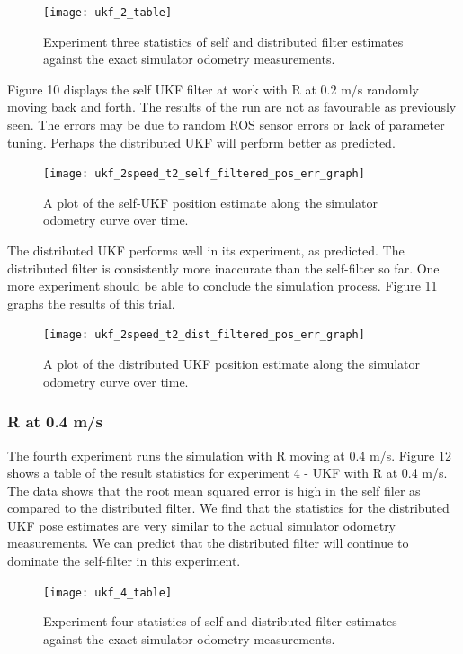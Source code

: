 \documentclass[conference]{IEEEtran} \usepackage[T1]{fontenc} \usepackage[backend=biber, style=ieee]{biblatex}
\begin{document}
\begin{figure}[!ht]
\label{pic9} 
\centering 
\texttt{[image: ukf\_2\_table]}
\caption{Experiment three statistics of self and distributed filter estimates against the exact simulator odometry measurements.} 
\end{figure}

Figure 10 displays the self UKF filter at work with R at 0.2 m/s randomly moving back 
and forth. The results of the run are not as favourable as previously seen. The 
errors may be due to random ROS sensor errors or lack of parameter tuning. Perhaps 
the distributed UKF will perform better as predicted.

\begin{figure}
\centering 
\texttt{[image: ukf\_2speed\_t2\_self\_filtered\_pos\_err\_graph]}
\caption {A plot of the self-UKF position estimate along the simulator odometry curve over time.}
\label{pic10} 
\end{figure}

The distributed UKF performs well in its experiment, as predicted. The distributed filter is consistently 
more inaccurate than the self-filter so far. One more experiment should be able to conclude the simulation process. 
Figure 11 graphs the results of this trial. 

\begin{figure}
\centering 
\texttt{[image: ukf\_2speed\_t2\_dist\_filtered\_pos\_err\_graph]}
\caption {A plot of the distributed UKF position estimate along the simulator odometry curve over time.}
\label{pic11} 
\end{figure}

\subsubsection{R at 0.4 m/s} \label{UKF .4}
The fourth experiment runs the simulation with R moving at 0.4 m/s. Figure 12 shows a table of the result statistics for experiment 4 - UKF 
with R at 0.4 m/s. The data shows that the root mean squared error is high in the self filer as compared to the distributed filter. 
We find that the statistics for the distributed UKF pose estimates are very similar to the actual simulator 
odometry measurements. We can predict that the distributed filter will continue to dominate the self-filter in 
this experiment.

\begin{figure}[!ht]
\label{pic12} 
\centering 
\texttt{[image: ukf\_4\_table]}
\caption{Experiment four statistics of self and distributed filter estimates against the exact simulator odometry measurements.} 
\end{figure}
\end{document}
